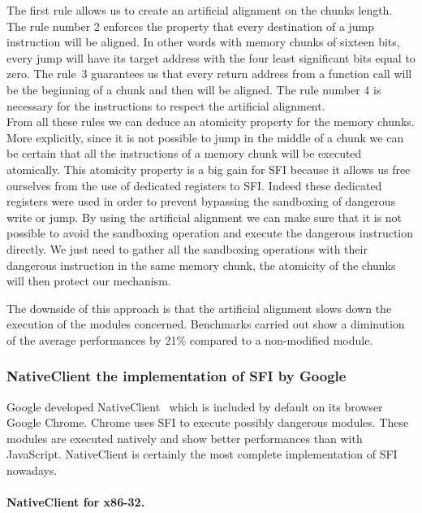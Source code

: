 \documentclass[11pt]{sdm}
\begin{document}
The first rule allows us to create an artificial alignment on the chunks length. The rule number 2 enforces the property that every destination of a jump instruction will be aligned. In other words with memory chunks of sixteen bits, every jump will have its target address with the four least significant bits equal to zero. 
The rule~3 guarantees us that every return address from a function call will be the beginning of a chunk and then will be aligned. The rule number 4 is necessary for the instructions to respect the artificial alignment. \\
From all these rules we can deduce an atomicity property for the memory chunks. More explicitly, since it is not possible to jump in the middle of a chunk we can be certain that all the instructions of a memory chunk will be executed atomically.
This atomicity property is a big gain for SFI because it allows us free ourselves from the use of dedicated registers to SFI. Indeed these dedicated registers were used in order to prevent bypassing the sandboxing of dangerous write or jump. By using the artificial alignment we can make sure that it is not possible to avoid the sandboxing operation and execute the dangerous instruction directly.
We just need to gather all the sandboxing operations with their dangerous instruction in the same memory chunk, the atomicity of the chunks will then protect our mechanism.

The downside of this approach is that the artificial alignment slows down the execution of the modules concerned. Benchmarks carried out show a diminution of the average performances by 21\% compared to a non-modified module.

\subsubsection{NativeClient the implementation of SFI by Google}
\label{ssub:NativeClient the implementation of SFI by Google}
Google developed NativeClient~\cite{Yee:2010:NCS:1629175.1629203} which is included by default on its browser Google Chrome. Chrome uses SFI to execute possibly dangerous modules. These modules are executed natively and show better performances than with JavaScript. NativeClient is certainly the most complete implementation of SFI nowadays.

\paragraph{NativeClient for x86-32.}
\label{par:NaCl_32}
\end{document}
